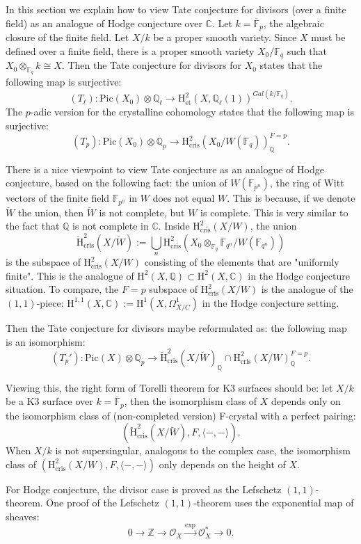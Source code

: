 \documentclass[a4paper,12pt,twoside]{report}
\newcommand{\Q}{\mathbb{Q}}
\newcommand{\Z}{\mathbb{Z}}
\newcommand{\F}{\mathbb{F}}
\newcommand{\Cm}{\mathbb{C}}
\newcommand{\cris}{\mathrm{cris}}
\newcommand{\et}{\mathrm{\acute{e}t}}
\newcommand{\Pic}{\mathrm{Pic}}
\newcommand{\HH}{\mathrm{H}}
\begin{document}
In this section we explain how to view Tate conjecture for divisors (over a finite field)
 as an analogue of Hodge conjecture over $\Cm$. 
Let $k=\overline{\F}_p$, the algebraic closure of the finite field. 
Let $X/k$ be a proper smooth variety. Since $X$ must be defined over a finite field, 
there is a proper smooth variety $X_0/\F_q$ such that $X_0\otimes_{\F_q}k\cong X$. 
Then the Tate conjecture for divisors for $X_0$ states that the following map is surjective: 
\[(T_{\ell}): \Pic(X_0)\otimes \Q_\ell \longrightarrow \HH^2_{\et}(X,\Q_{\ell}(1))^{Gal(k/\F_q)}.\] 
The $p$-adic version for the crystalline cohomology states that the following map is surjective: 
\[(T_{p}): \Pic(X_0)\otimes \Q_{p} \longrightarrow \HH^2_{\cris}(X_0/W(\F_q))_{\Q}^{F=p}. \]

There is a nice viewpoint to view Tate conjecture as an analogue of Hodge conjecture, based on the following fact: 
the union of $W(\F_{p^n})$, the ring of Witt vectors of the finite field $\F_{p^n}$ in $W$ does not equal $W$. 
This is because, if we denote $\breve{W}$ the union, then $\breve{W}$ is not complete, but $W$ is complete. 
This is very similar to the fact that $\Q$ is not complete in $\Cm$. 
Inside $\HH^2_{\cris}(X/W)$, the union \[\breve{\HH}^2_{\cris}(X/\breve{W}):=\bigcup_{n}\HH^2_{\cris}(X_0\otimes_{\F_q}\F_{q^n}/W(\F_{q^n}))\]
is the subspace of $\HH^2_{\cris}(X/W)$ consisting of the elements that are "uniformly finite". 
This is the analogue of $\HH^2(X,\Q)\subset \HH^2(X,\Cm)$ in the Hodge conjecture situation.
To compare, the $F=p$ subspace of $\HH^2_{\cris}(X/W)$ is the analogue of the $(1,1)$-piece: 
$\HH^{1,1}(X,\Cm):=\HH^1(X,\Omega^1_{X/C})$ in the Hodge conjecture setting. 

Then the Tate conjecture for divisors maybe reformulated as: the following map is an isomorphism:
\[(T_p'): \Pic(X)\otimes \Q_p \longrightarrow \breve{\HH}^2_{\cris}(X/\breve{W})_{\Q} \cap \HH^2_{\cris}(X/W)_{\Q}^{F=p}.\]

Viewing this, the right form of Torelli theorem for K3 surfaces should be: let $X/k$ be a K3 surface over $k=\overline{\F}_p$, 
then the isomorphism class of $X$ depends only on the isomorphism class of (non-completed version) F-crystal with a perfect pairing:
\[(\breve{\HH}^2_{\cris}(X/\breve{W}),F,\langle-,-\rangle).\]
When $X/k$ is not supersingular, analogous to the complex case,
the isomorphism class of $(\HH^2_{\cris}(X/W),F,\langle-,-\rangle)$ only depends on the height of $X$. 

For Hodge conjecture, the divisor case is proved as the Lefschetz $(1,1)$-theorem. 
One proof of the Lefschetz $(1,1)$-theorem uses the exponential map of sheaves: 
\[0\rightarrow \Z \rightarrow \mathcal{O}_X \xrightarrow{\exp} \mathcal{O}_X^* \rightarrow 0. \]
\end{document}
